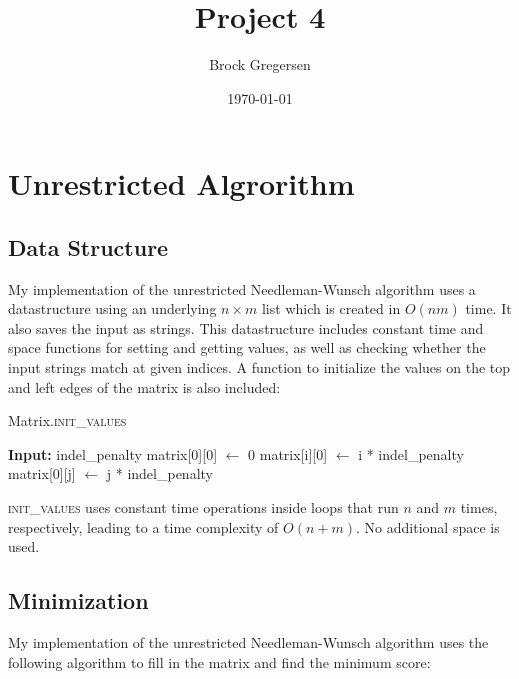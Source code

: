 \documentclass[12pt]{article}
\title{Project 4}
\author{Brock Gregersen}
\date{\today}
\begin{document}
\maketitle

\tableofcontents
\newpage

\section{Unrestricted Algrorithm}
\subsection{Data Structure}
My implementation of the unrestricted Needleman-Wunsch algorithm uses
a datastructure using an underlying $n \times m$ list which is created in $O(nm)$
time. It also saves the input as strings. This datastructure includes
constant time and space functions for setting and getting values, as well
as checking whether the input strings match at given indices. A function to
initialize the values on the top and left edges of the matrix is also included:

\begin{algorithm}[H]
    \caption{Matrix.\textsc{init\_values}}
    \begin{algorithmic}[1]
        \State \textbf{Input:} indel\_penalty
        \State matrix[0][0] $\gets$ 0
         
            \State matrix[i][0] $\gets$ i * indel\_penalty
        \EndFor
         
            \State matrix[0][j] $\gets$ j * indel\_penalty
        \EndFor
    \end{algorithmic}
\end{algorithm}

\textsc{init\_values} uses constant time operations inside loops that
run $n$ and $m$ times, respectively, leading to a time complexity of
$O(n + m)$. No additional space is used.

\subsection{Minimization}

My implementation of the unrestricted Needleman-Wunsch algorithm uses the
following algorithm to fill in the matrix and find the minimum score:
\end{document}
